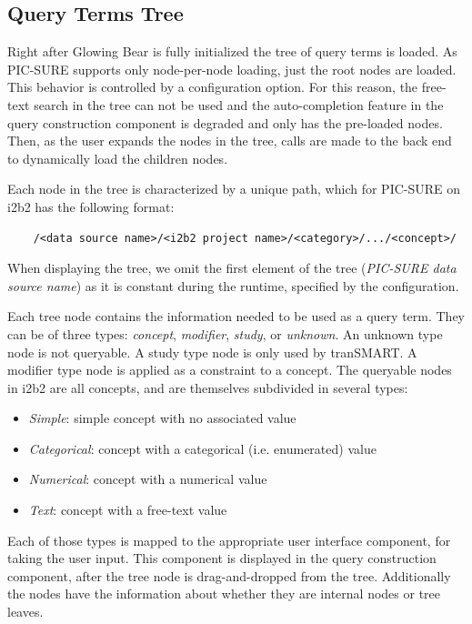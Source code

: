 \subsection{Query Terms Tree}
\label{sec:design-tree}

Right after Glowing Bear is fully initialized the tree of query terms is loaded.
As PIC-SURE supports only node-per-node loading, just the root nodes are loaded. 
This behavior is controlled by a configuration option.
For this reason, the free-text search in the tree can not be used and the auto-completion feature in the query construction component is degraded and only has the pre-loaded nodes.
Then, as the user expands the nodes in the tree, calls are made to the back end to dynamically load the children nodes.

Each node in the tree is characterized by a unique path, which for PIC-SURE on i2b2 has the following format:
\begin{verbatim}
    /<data source name>/<i2b2 project name>/<category>/.../<concept>/
\end{verbatim}
When displaying the tree, we omit the first element of the tree (\emph{PIC-SURE data source name}) as it is constant during the runtime, specified by the configuration.

Each tree node contains the information needed to be used as a query term.
They can be of three types: \emph{concept}, \emph{modifier}, \emph{study}, or \emph{unknown}.
An unknown type node is not queryable. 
A study type node is only used by tranSMART.
A modifier type node is applied as a constraint to a concept.
The queryable nodes in i2b2 are all concepts, and are themselves subdivided in several types:
\begin{itemize}
    \setlength\itemsep{0em}
    \item \emph{Simple}: simple concept with no associated value
    \item \emph{Categorical}: concept with a categorical (i.e. enumerated) value
    \item \emph{Numerical}: concept with a numerical value
    \item \emph{Text}: concept with a free-text value
\end{itemize}
Each of those types is mapped to the appropriate user interface component, for taking the user input.
This component is displayed in the query construction component, after the tree node is drag-and-dropped from the tree.
Additionally the nodes have the information about whether they are internal nodes or tree leaves.


